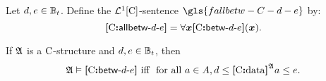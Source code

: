 \begin{definition}
Let $\datad, \datae \in \tBitnums\tbit$.
Define the $\vFoF1\CS$-sentence $\gls{fallbetw-C-d-e}$ by:
\[
  \fallbetw\CS\datad\datae = \forall\xx\fbetw\CS\datad\datae(\xx).
\]
\end{definition}
\begin{remark}
If $\StrA$ is a $\CS$-structure and $\datad,\datae \in \tBitnums\tbit$,
then 
\[
\miff{\StrA \vDash \fbetw\CS\datad\datae}{
\text{ for all } \ea \in \domA, \datad \leq \data\CS\StrA\ea \leq \datae.}
\]
\end{remark}